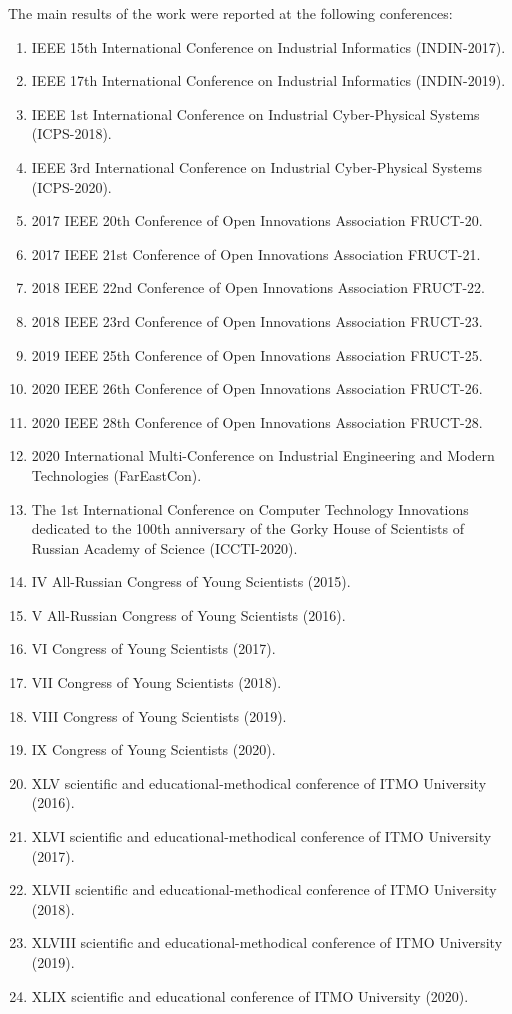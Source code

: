 {\probationEn}
The main results of the work were reported at the following conferences:
\begin{enumerate}[beginpenalty=10000]
	\item IEEE 15th International Conference on Industrial Informatics (INDIN-2017).
	\item IEEE 17th International Conference on Industrial Informatics (INDIN-2019).
	\item IEEE 1st International Conference on Industrial Cyber-Physical Systems (ICPS-2018).
	\item IEEE 3rd International Conference on Industrial Cyber-Physical Systems (ICPS-2020).
	\item 2017 IEEE 20th Conference of Open Innovations Association {FRUCT-20}.
	\item 2017 IEEE 21st Conference of Open Innovations Association {FRUCT-21}.
	\item 2018 IEEE 22nd Conference of Open Innovations Association {FRUCT-22}.
	\item 2018 IEEE 23rd Conference of Open Innovations Association {FRUCT-23}.
	\item 2019 IEEE 25th Conference of Open Innovations Association {FRUCT-25}.
	\item 2020 IEEE 26th Conference of Open Innovations Association {FRUCT-26}.
	\item 2020 IEEE 28th Conference of Open Innovations Association {FRUCT-28}.
	\item 2020 International Multi-Conference on Industrial Engineering and Modern Technologies (FarEastCon).
	\item The 1st International Conference on Computer Technology Innovations dedicated to the 100th anniversary of the Gorky House of Scientists of Russian Academy of Science (ICCTI-2020).
	\item IV All-Russian Congress of Young Scientists (2015).
	\item V All-Russian Congress of Young Scientists (2016).
	\item VI Congress of Young Scientists (2017).
	\item VII Congress of Young Scientists (2018).
	\item VIII Congress of Young Scientists (2019).
	\item IX Congress of Young Scientists (2020).
	\item XLV scientific and educational-methodical conference of {ITMO} University (2016).
	\item XLVI scientific and educational-methodical conference of {ITMO} University (2017).
	\item XLVII scientific and educational-methodical conference of {ITMO} University (2018).
	\item XLVIII scientific and educational-methodical conference of {ITMO} University (2019).
	\item XLIX scientific and educational conference of {ITMO} University (2020).
\end{enumerate}

